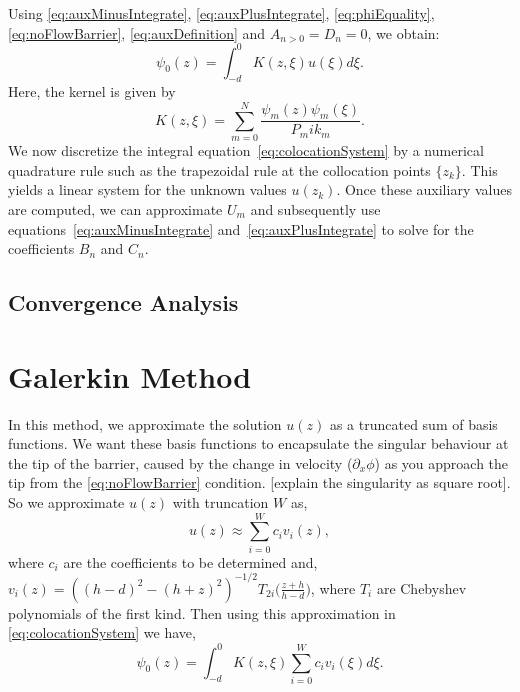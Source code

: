 \documentclass[a4paper,12pt]{report}
\begin{document}
Using \ref{eq:auxMinusIntegrate}, \ref{eq:auxPlusIntegrate}, \ref{eq:phiEquality}, \ref{eq:noFlowBarrier}, \ref{eq:auxDefinition} and $A_{n>0} = D_n = 0$, we obtain:
\begin{equation}
\label{eq:colocationSystem}
\psi_0(z) = \int_{-d}^0 K(z,\xi) u(\xi) d\xi.
\end{equation}
Here, the kernel is given by
\[
K(z,\xi) = \sum_{m=0}^{N} \frac{\psi_m(z)\psi_m(\xi)}{P_m i k_m}.
\]
We now discretize the integral equation~\eqref{eq:colocationSystem} by a numerical quadrature rule such as the trapezoidal rule at the collocation points $\{z_k\}$. This yields a linear system for the unknown values $u(z_k)$. Once these auxiliary values are computed, we can approximate $U_m$ and subsequently use equations~\eqref{eq:auxMinusIntegrate} and~\eqref{eq:auxPlusIntegrate} to solve for the coefficients $B_n$ and $C_n$.
\subsection{Convergence Analysis}


\section{Galerkin Method}
In this method, we approximate the solution $u(z)$ as a truncated sum of basis functions. We want these basis functions to encapsulate the singular behaviour at the tip of the barrier, caused by the change in velocity ($\partial_x \phi$) as you approach the tip from the \ref{eq:noFlowBarrier} condition. [explain the singularity as square root]. So we approximate $u(z)$ with truncation $W$ as,
\begin{equation}
\label{eq:galerkinApprox}
u(z) \approx \sum_{i=0}^{W} c_i v_i(z),
\end{equation}
where $c_i$ are the coefficients to be determined and,\\ $\displaystyle v_i(z) = ((h-d)^2-(h+z)^2)^{-1/2}T_{2i}\Big(\frac{z+h}{h-d}\Big)$, where $T_i$ are Chebyshev polynomials of the first kind. Then using this approximation in \ref{eq:colocationSystem} we have,
\begin{equation}
\label{eq:galerkinSystem}
\psi_0(z) = \int_{-d}^0 K(z,\xi) \sum_{i=0}^{W} c_i v_i(\xi) d\xi.
\end{equation}
\end{document}
